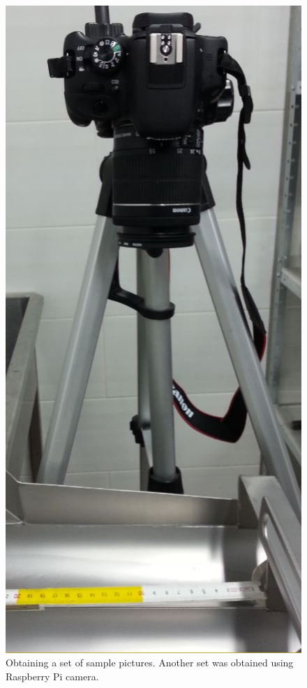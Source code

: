 \documentclass[12pt,twoside,a4paper]{article}
\begin{document}
\begin{figure}[H]
\centering
\includegraphics[width=0.2\paperwidth]{samples}
\caption{Obtaining a set of sample pictures. Another set was obtained using Raspberry Pi camera.}\label{fig:samples}
\end{figure}
\end{document}
